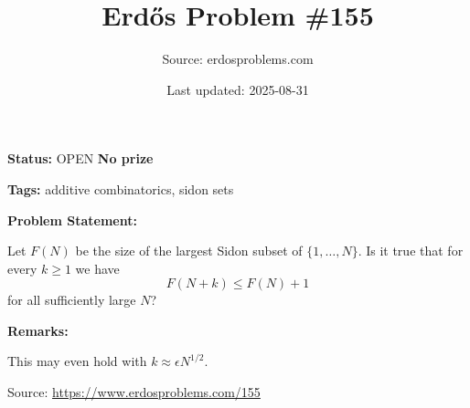 \documentclass{article}
\title{Erd\H{o}s Problem \#155}
\date{Last updated: 2025-08-31}
\author{Source: erdosproblems.com}
\begin{document}
\maketitle

\noindent\textbf{Status:} OPEN \quad \textbf{No prize}

\noindent\textbf{Tags:} additive combinatorics, sidon sets

\medskip
\noindent\textbf{Problem Statement:}

Let $F(N)$ be the size of the largest Sidon subset of $\{1,\ldots,N\}$. Is it true that for every $k\geq 1$ we have\[F(N+k)\leq F(N)+1\]for all sufficiently large $N$?

\bigskip
\noindent\textbf{Remarks:}

This may even hold with $k\approx \epsilon N^{1/2}$.

\bigskip
\noindent\small{Source: \url{https://www.erdosproblems.com/155}}
\end{document}
